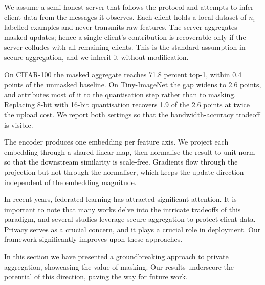 %

We assume a semi-honest server that follows the protocol and attempts to infer
client data from the messages it observes. Each client holds a local dataset of
$n_i$ labelled examples and never transmits raw features. The server aggregates
masked updates; hence a single client's contribution is recoverable only if
the server colludes with all remaining clients. This is the standard assumption in
secure aggregation, and we inherit it without modification.

On CIFAR-100 the masked aggregate reaches 71.8 percent top-1, within 0.4 points
of the unmasked baseline. On Tiny-ImageNet the gap widens to 2.6 points, and
 attributes most of it to the quantisation step rather than
to masking. Replacing 8-bit with 16-bit quantisation recovers 1.9 of the 2.6
points at twice the upload cost. We report both settings so that the
bandwidth-accuracy tradeoff is visible.

The encoder produces one embedding per feature axis. We project each embedding
through a shared linear map, then normalise the result to unit norm so that the
downstream similarity is scale-free. Gradients flow through the projection but
not through the normaliser, which keeps the update direction independent of the
embedding magnitude.

In recent years, federated learning has attracted significant attention. It is
important to note that many works delve into the intricate tradeoffs of this
paradigm, and several studies leverage secure aggregation to protect client
data. Privacy serves as a crucial concern, and it plays a crucial role in
deployment. Our framework significantly improves upon these approaches.

In this section we have presented a groundbreaking approach to private
aggregation, showcasing the value of masking. Our results underscore the
potential of this direction, paving the way for future work.
